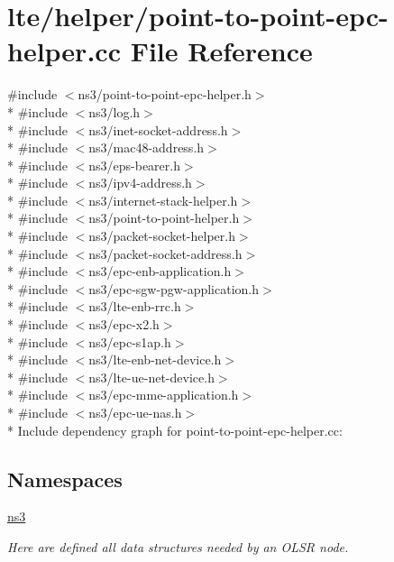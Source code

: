 \hypertarget{point-to-point-epc-helper_8cc}{}\section{lte/helper/point-\/to-\/point-\/epc-\/helper.cc File Reference}
\label{point-to-point-epc-helper_8cc}
{\ttfamily \#include $<$ns3/point-\/to-\/point-\/epc-\/helper.\+h$>$}\\*
{\ttfamily \#include $<$ns3/log.\+h$>$}\\*
{\ttfamily \#include $<$ns3/inet-\/socket-\/address.\+h$>$}\\*
{\ttfamily \#include $<$ns3/mac48-\/address.\+h$>$}\\*
{\ttfamily \#include $<$ns3/eps-\/bearer.\+h$>$}\\*
{\ttfamily \#include $<$ns3/ipv4-\/address.\+h$>$}\\*
{\ttfamily \#include $<$ns3/internet-\/stack-\/helper.\+h$>$}\\*
{\ttfamily \#include $<$ns3/point-\/to-\/point-\/helper.\+h$>$}\\*
{\ttfamily \#include $<$ns3/packet-\/socket-\/helper.\+h$>$}\\*
{\ttfamily \#include $<$ns3/packet-\/socket-\/address.\+h$>$}\\*
{\ttfamily \#include $<$ns3/epc-\/enb-\/application.\+h$>$}\\*
{\ttfamily \#include $<$ns3/epc-\/sgw-\/pgw-\/application.\+h$>$}\\*
{\ttfamily \#include $<$ns3/lte-\/enb-\/rrc.\+h$>$}\\*
{\ttfamily \#include $<$ns3/epc-\/x2.\+h$>$}\\*
{\ttfamily \#include $<$ns3/epc-\/s1ap.\+h$>$}\\*
{\ttfamily \#include $<$ns3/lte-\/enb-\/net-\/device.\+h$>$}\\*
{\ttfamily \#include $<$ns3/lte-\/ue-\/net-\/device.\+h$>$}\\*
{\ttfamily \#include $<$ns3/epc-\/mme-\/application.\+h$>$}\\*
{\ttfamily \#include $<$ns3/epc-\/ue-\/nas.\+h$>$}\\*
Include dependency graph for point-\/to-\/point-\/epc-\/helper.cc\+:
\subsection*{Namespaces}
\begin{DoxyCompactItemize}
\item 
 \hyperlink{namespacens3}{ns3}
\begin{DoxyCompactList}\small\item\em Here are defined all data structures needed by an O\+L\+SR node. \end{DoxyCompactList}\end{DoxyCompactItemize}
